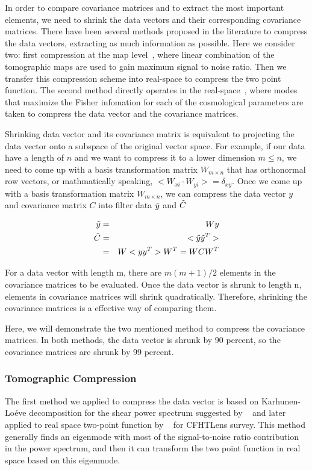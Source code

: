 \documentclass[twocolumn]{\docclass}
\def\bea{\begin{eqnarray}}
\def\eea{\end{eqnarray}}
\begin{document}
In order to compare covariance matrices and to extract the most important elements, we need to shrink the data vectors and their corresponding covariance matrices. There have been several methods proposed in the literature to compress the data vectors, extracting as much information as possible. Here we consider two: first compression at the map level~\citep{Alonso:2017hhj}, where linear combination of the tomographic maps are used to gain maximum signal to noise ratio. Then we transfer this compression scheme into real-space to compress the two point function. The second method directly operates in the real-space~\citep{Zablocki:2015zcm}, where modes that maximize the Fisher infomation for each of the cosmological parameters are taken to compress the data vector and the covariance matrices.

Shrinking data vector and its covariance matrix is equivalent to projecting the data vector onto a subspace of the original vector space. For example, if our data have a length of $n$ and we want to compress it to a lower dimension $m\leq n$, we need to come up with a basis transformation matrix $W_{m\times n}$ that has orthonormal row vectors, or mathmatically speaking, $<W_{xi} \cdot W_{yi}>=\delta_{xy}$. Once we come up with a basis transformation matrix $W_{m\times n}$, we can compress the data vector $y$ and covariance matrix $C$ into filter data $\Tilde{y}$ and $\Tilde{C}$

\bea
\Tilde{y} &=& W y\\\nonumber
\Tilde{C} &=&<\Tilde{y}  \Tilde{y}^T>\\
&=&W<y y^T> W^T= W C W^T
\eea

For a data vector with length m, there are $m(m+1)/2$ elements in the covariance matrices to be evaluated. Once the data vector is shrunk to length n, elements in covariance matrices will shrink quadratically. Therefore, shrinking the covariance matrices is a effective way of comparing them.

Here, we will demonstrate the two mentioned method to compress the covariance matrices. In both methods, the data vector is shrunk by 90 percent, so the covariance matrices are shrunk by 99 percent. 

\subsubsection{Tomographic Compression}

The first method we applied to compress the data vector is based on Karhunen-Lo\'eve decomposition for the shear power spectrum suggested by ~\citep{Alonso:2017hhj} and later applied to real space two-point function by ~\citep{Bel:2017hhj} for CFHTLens survey. This method generally finds an eigenmode with most of the signal-to-noise ratio contribution in the power spectrum, and then it can transform the two point function in real space based on this eigenmode.
\end{document}
